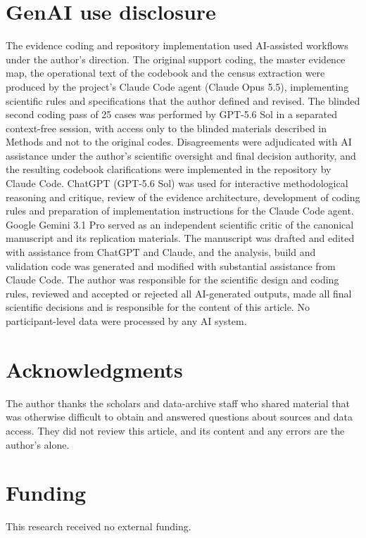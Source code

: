 \documentclass[11pt]{article}
\begin{document}
\section*{GenAI use disclosure}
The evidence coding and repository implementation used AI-assisted workflows under the author's direction. 
The original support coding, the master evidence map, the operational text of the codebook and the census extraction 
were produced by the project's Claude Code agent (Claude Opus 5.5), implementing scientific rules and specifications 
that the author defined and revised. 
The blinded second coding pass of 25 cases was performed by GPT-5.6 Sol in a separated context-free session, with access 
only to the blinded materials described in Methods and not to the original codes. %
Disagreements were adjudicated with AI assistance under the author's scientific oversight and final decision authority, 
and the resulting codebook clarifications were implemented in the repository by Claude Code. 
ChatGPT (GPT-5.6 Sol) was used for interactive methodological reasoning and critique, review of the evidence architecture, 
development of coding rules and preparation of implementation instructions for the Claude Code agent. 
Google Gemini 3.1 Pro served as an independent scientific critic of the canonical manuscript and its replication materials. 
The manuscript was drafted and edited with assistance from ChatGPT and Claude, and the analysis, build and validation code was 
generated and modified with substantial assistance from Claude Code. 
The author was responsible for the scientific design and coding rules, reviewed and accepted or rejected all AI-generated outputs, 
made all final scientific decisions and is responsible for the content of this article. 
No participant-level data were processed by any AI system.

\section*{Acknowledgments}
The author thanks the scholars and data-archive staff who shared material that was otherwise difficult to obtain and answered questions about sources and data access. They did not review this article, and its content and any errors are the author's alone.

\section*{Funding}
This research received no external funding.
\end{document}
